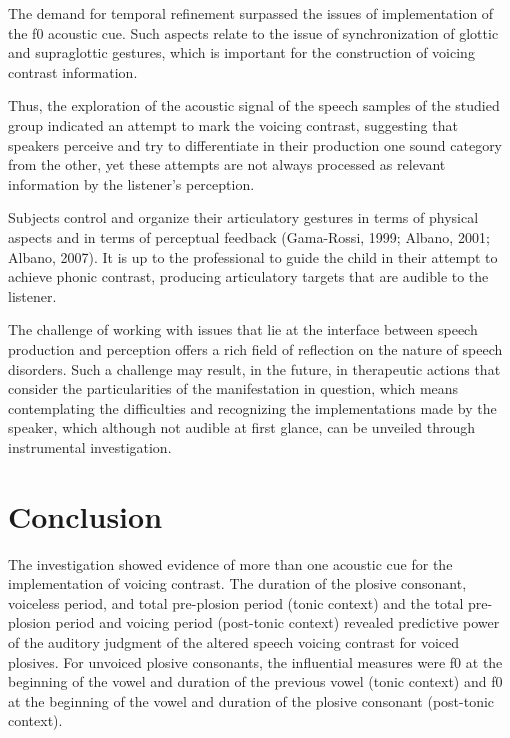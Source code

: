 The demand for temporal refinement surpassed the issues of implementation of
the f0 acoustic cue. Such aspects relate to the issue of synchronization of
glottic and supraglottic gestures, which is important for the construction of
voicing contrast information.

Thus, the exploration of the acoustic signal of the speech samples of the
studied group indicated an attempt to mark the voicing contrast, suggesting
that speakers perceive and try to differentiate in their production one sound
category from the other, yet these attempts are not always processed as
relevant information by the listener's perception.

Subjects control and organize their articulatory gestures in terms of physical
aspects and in terms of perceptual feedback (Gama-Rossi, 1999; Albano, 2001;
Albano, 2007). It is up to the professional to guide the child in their attempt
to achieve phonic contrast, producing articulatory targets that are audible to
the listener.

The challenge of working with issues that lie at the interface between speech
production and perception offers a rich field of reflection on the nature of
speech disorders. Such a challenge may result, in the future, in therapeutic
actions that consider the particularities of the manifestation in question,
which means contemplating the difficulties and recognizing the implementations
made by the speaker, which although not audible at first glance, can be
unveiled through instrumental investigation.

\section{Conclusion}
The investigation showed evidence of more than one acoustic cue for the
implementation of voicing contrast. The duration of the plosive consonant,
voiceless period, and total pre-plosion period (tonic context) and the total
pre-plosion period and voicing period (post-tonic context) revealed predictive
power of the auditory judgment of the altered speech voicing contrast for
voiced plosives. For unvoiced plosive consonants, the influential measures were
f0 at the beginning of the vowel and duration of the previous vowel (tonic
context) and f0 at the beginning of the vowel and duration of the plosive
consonant (post-tonic context).





